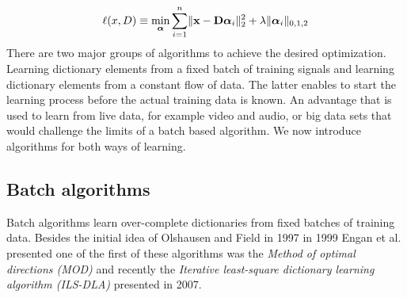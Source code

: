 \begin{align} 
\ell(x,D) \equiv \min_{\boldsymbol{\mathrm{\alpha}}} \sum_{i=1}^n
\lVert \boldsymbol{\mathrm{x}} - \boldsymbol{\mathrm{D}}\boldsymbol{\mathrm{\alpha}}_i \rVert^{2}_{2}  +  \lambda \lVert
\boldsymbol{\mathrm{\alpha}}_i
\rVert_{0,1,2}
\end{align}
There are two major groups of algorithms to achieve the desired optimization.
Learning dictionary elements from a fixed batch of training
signals and learning dictionary elements from a constant flow of data. The
latter enables to start the learning process before the actual training data is
known. An advantage that is used to learn from live data, for example video and
audio, or big data sets that would challenge the limits of a batch based
algorithm. We now introduce algorithms for both ways of learning.

\subsection{Batch algorithms}
Batch algorithms learn over-complete dictionaries from fixed batches of
training data. Besides the initial idea of Olshausen and Field in
1997\cite{Olshausen1997} in 1999 Engan et al.\cite{Engan1999a} presented one of
the first of these algorithms was the \emph{Method of optimal directions (MOD)}
and recently the \emph{Iterative least-square dictionary learning algorithm
(ILS-DLA)}\cite{Engan2007} presented in 2007. 


